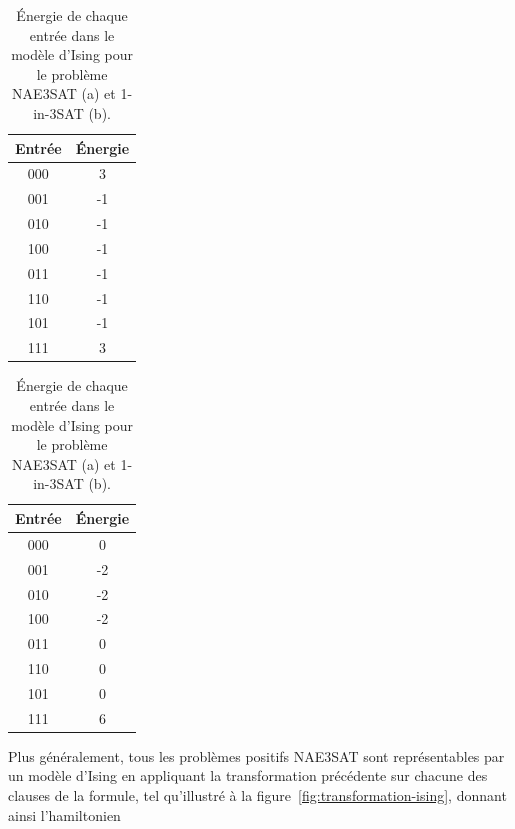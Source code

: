 \begin{table}[h]
    \centering
    \begin{subtable}{0.4\textwidth}
        \centering
        \begin{tabular}{c c}
            \hline
            Entrée & Énergie \\
            \hline
            000 & 3 \\
            001 & -1 \\
            010 & -1 \\
            100 & -1 \\
            011 & -1 \\
            110 & -1 \\
            101 & -1 \\
            111 & 3 \\
            \hline
        \end{tabular}
        \caption{}
        \label{tab:energie-nae3sat}
    \end{subtable}
    \begin{subtable}{0.4\textwidth}
        \centering
        \begin{tabular}{c c}
            \hline
            Entrée & Énergie \\
            \hline
            000 & 0 \\
            001 & -2 \\
            010 & -2 \\
            100 & -2 \\
            011 & 0 \\
            110 & 0 \\
            101 & 0 \\
            111 & 6 \\
            \hline
        \end{tabular}
        \caption{}
        \label{tab:energie-1in3sat}
    \end{subtable}
    \caption{Énergie de chaque entrée dans le modèle d'Ising pour le problème NAE3SAT (a) et 1-in-3SAT (b).}
\end{table}

Plus généralement, tous les problèmes positifs NAE3SAT sont représentables par un modèle d'Ising en appliquant la transformation précédente sur chacune des clauses de la formule, tel qu'illustré à la figure~\ref{fig:transformation-ising}, donnant ainsi l'hamiltonien 

